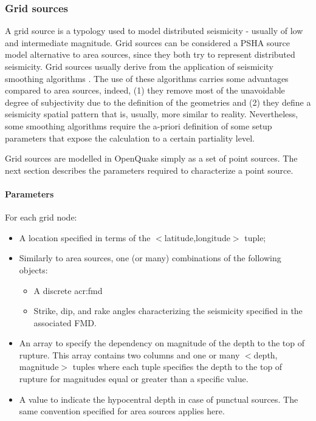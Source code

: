 \subsubsection{Grid sources}
\label{hazard:seismic_source_types:gridSources}
A grid source  is a typology used to model distributed seismicity - usually 
of low and intermediate magnitude.
%
Grid sources can be considered a PSHA source model alternative to area 
sources, since they both try to represent distributed seismicity. Grid sources 
usually derive from the application of seismicity smoothing algorithms 
\citep{frankel1995,woo1996}. 
%
The use of these algorithms carries some advantages compared to area sources, 
indeed, (1) they remove most of the unavoidable degree of subjectivity due to 
the definition of the geometries and (2) they define a seismicity spatial 
pattern that is, usually, more similar to reality. Nevertheless, some smoothing 
algorithms require the a-priori definition of some setup parameters that expose 
the calculation to a certain partiality level.

Grid sources are modelled in OpenQuake simply as a set of 
point sources. The next section describes the parameters required to 
characterize a point source.
%
\paragraph{Parameters}
%
For each grid node:
\begin{itemize}
\item A location specified in terms of the $<$latitude,longitude$>$ tuple;
\item Similarly to area sources, one (or many) combinations of the following 
objects:
	\begin{itemize}
	\item A discrete \gls{acr:fmd}
	\item Strike, dip, and rake angles characterizing the seismicity 
	specified in the associated FMD. 
	\end{itemize}
\item An array to specify the dependency on magnitude of the depth to 
	the top of rupture. This array contains two columns and one or many 
	$<$depth, magnitude$>$ tuples where each tuple specifies the depth to the 
	top of rupture for magnitudes equal or greater than a specific value. 
\item A value to indicate the hypocentral depth in case of punctual sources. 
	The same convention specified for area sources applies here. 
\end{itemize} 
%
